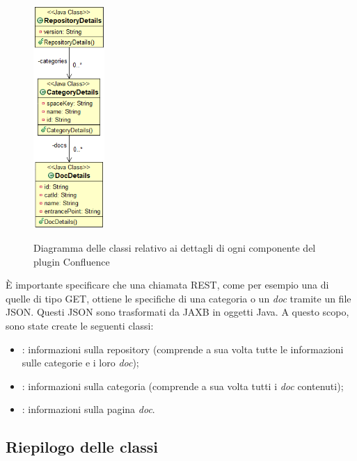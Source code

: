 \begin{figure}[H]
    \centering
    \includegraphics[width=0.24\textwidth]{immagini/details.png}\\
    \caption{Diagramma delle classi relativo ai dettagli di ogni componente del plugin Confluence}
\end{figure}

È importante specificare che una chiamata REST, come per esempio una di quelle di tipo GET, ottiene le specifiche di una categoria o un \emph{doc} tramite un file JSON.
Questi JSON sono trasformati da JAXB in oggetti Java.
A questo scopo, sono state create le seguenti classi:
\begin{itemize}
    \item {}: informazioni sulla repository (comprende a sua volta tutte le informazioni sulle categorie e i loro \emph{doc});
    \item {}: informazioni sulla categoria (comprende a sua volta tutti i \emph{doc} contenuti);
    \item {}: informazioni sulla pagina \emph{doc}.
\end{itemize}

\clearpage

    \subsection{Riepilogo delle classi}

